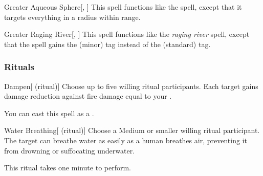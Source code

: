 \lowercase{\hypertarget{spell:Greater Aqueous Sphere}{}}\label{spell:Greater Aqueous Sphere}
\begin{apability}[\nth{4}]{\hypertarget{spell:Greater Aqueous Sphere}{Greater Aqueous Sphere}}[, ]
This spell functions like the  spell, except that it targets everything in a \areamed radius within \rnglong range.
\end{apability}
\vspace{0.25em}



\lowercase{\hypertarget{spell:Greater Raging River}{}}\label{spell:Greater Raging River}
\begin{apability}[\nth{5}]{\hypertarget{spell:Greater Raging River}{Greater Raging River}}[, ]
This spell functions like the \textit{raging river} spell, except that the spell gains the  (minor) tag instead of the  (standard) tag.
\end{apability}
\vspace{0.25em}



\subsubsection{Rituals}


\lowercase{\hypertarget{spell:Dampen}{}}\label{spell:Dampen}
\begin{attuneability}[\nth{1}]{\hypertarget{spell:Dampen}{Dampen}}[ (ritual)]
Choose up to five willing ritual participants.
Each target gains damage reduction against fire damage equal to your .

You can cast this spell as a .
\end{attuneability}
\vspace{0.25em}



\lowercase{\hypertarget{spell:Water Breathing}{}}\label{spell:Water Breathing}
\begin{attuneability}[\nth{2}]{\hypertarget{spell:Water Breathing}{Water Breathing}}[ (ritual)]
Choose a Medium or smaller willing ritual participant.
The target can breathe water as easily as a human breathes air, preventing it from drowning or suffocating underwater.

This ritual takes one minute to perform.
\end{attuneability}
\vspace{0.25em}


